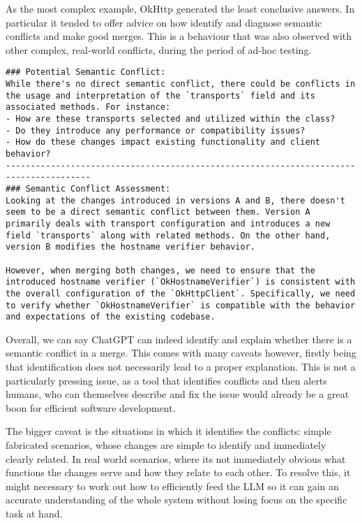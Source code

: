 As the most complex example, OkHttp generated the least conclusive answers. In particular it tended to offer advice on how identify and diagnose semantic conflicts and make good merges. This is a behaviour that was also observed with other complex, real-world conflicts, during the period of ad-hoc testing.
\begin{lstlisting}
### Potential Semantic Conflict:
While there's no direct semantic conflict, there could be conflicts in the usage and interpretation of the `transports` field and its associated methods. For instance:
- How are these transports selected and utilized within the class?
- Do they introduce any performance or compatibility issues?
- How do these changes impact existing functionality and client behavior?
---------------------------------------------------------------------------------------
### Semantic Conflict Assessment:
Looking at the changes introduced in versions A and B, there doesn't seem to be a direct semantic conflict between them. Version A primarily deals with transport configuration and introduces a new field `transports` along with related methods. On the other hand, version B modifies the hostname verifier behavior.

However, when merging both changes, we need to ensure that the introduced hostname verifier (`OkHostnameVerifier`) is consistent with the overall configuration of the `OkHttpClient`. Specifically, we need to verify whether `OkHostnameVerifier` is compatible with the behavior and expectations of the existing codebase.
\end{lstlisting}

Overall, we can say ChatGPT can indeed identify and explain whether there is a semantic conflict in a merge. This comes with many caveats however, firstly being that identification does not necessarily lead to a proper explanation. This is not a particularly pressing issue, as a tool that identifies conflicts and then alerts humans, who can themselves describe and fix the issue would already be a great boon for efficient software development.

The bigger caveat is the situations in which it identifies the conflicts: simple fabricated scenarios, whose changes are simple to identify and immediately clearly related. In real world scenarios, where its not immediately obvious what functions the changes serve and how they relate to each other. To resolve this, it might necessary to work out how to efficiently feed the LLM so it can gain an accurate understanding of the whole system without losing focus on the specific task at hand.